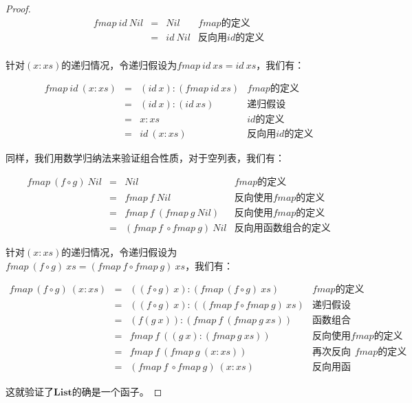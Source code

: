 \documentclass{article}
\begin{document}
\begin{example}
\begin{mdframed}
\begin{proof}
\[
\begin{array}{rcll}
fmap\ id\ Nil & = & Nil & \text{$fmap$的定义} \\
              & = & id\ Nil & \text{反向用$id$的定义} \\
\end{array}
\]

针对$(x:xs)$的递归情况，令递归假设为$fmap\ id\ xs = id\ xs$，我们有：

\[
\begin{array}{rcll}
fmap\ id\ (x:xs) & = & (id\ x):(fmap\ id\ xs) & \text{$fmap$的定义} \\
                 & = & (id\ x):(id\ xs) & \text{递归假设} \\
                 & = & x:xs & \text{$id$的定义} \\
                 & = & id\ (x:xs) & \text{反向用$id$的定义}
\end{array}
\]

同样，我们用数学归纳法来验证组合性质，对于空列表，我们有：

\[
\begin{array}{rcll}
fmap\ (f \circ g)\ Nil & = & Nil & \text{$fmap$的定义} \\
           & = & fmap\ f\ Nil & \text{反向使用$fmap$的定义} \\
           & = & fmap\ f\ (fmap\ g\ Nil) & \text{反向使用$fmap$的定义} \\
           & = & (fmap\ f\ \circ fmap\ g)\ Nil & \text{反向用函数组合的定义}
\end{array}
\]

针对$(x:xs)$的递归情况，令递归假设为$fmap\ (f \circ g)\ xs = (fmap\ f \circ fmap\ g)\ xs$，我们有：

\[
\begin{array}{rcll}
fmap\ (f \circ g)\ (x:xs) & = & ((f \circ g)\ x):(fmap\ (f \circ g)\ xs) & \text{$fmap$的定义} \\
  & = & ((f \circ g)\ x):((fmap\ f \circ fmap\ g)\ xs) & \text{递归假设} \\
  & = & (f(g\ x)):(fmap\ f\ (fmap\ g\ xs)) & \text{函数组合的定义} \\
  & = & fmap\ f\ ((g\ x):(fmap\ g\ xs)) & \text{反向使用$fmap$的定义} \\
  & = & fmap\ f\ (fmap\ g\ (x:xs)) & \text{再次反向使用$fmap$的定义} \\
  & = & (fmap\ f\ \circ fmap\ g)\ (x:xs) & \text{反向用函数组合的定义}
\end{array}
\]

这就验证了$\mathbf{List}$的确是一个函子。
\end{proof}
\end{mdframed}
\end{example}
\end{document}
